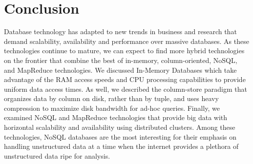 \documentclass[11pt,a4paper]{report}
\begin{document}
\section{Conclusion}
Database technology has adapted to new trends in business and research that demand scalability, availability and performance over massive databases. As these technologies continue to mature, we can expect to find more hybrid technologies on the frontier that combine the best of in-memory, column-oriented, NoSQL, and MapReduce technologies. We discussed In-Memory Databases which take advantage of the RAM access speeds and CPU processing capabilities to provide uniform data access times. As well, we described the column-store paradigm that organizes data by column on disk, rather than by tuple, and uses heavy compression to maximize disk bandwidth for ad-hoc queries. Finally, we examined NoSQL and MapReduce technologies that provide big data with horizontal scalability and availability using distributed clusters. Among these technologies, NoSQL databases are the most interesting for their emphasis on handling unstructured data at a time when the internet provides a plethora of unstructured data ripe for analysis.
\pagebreak


\end{document}
